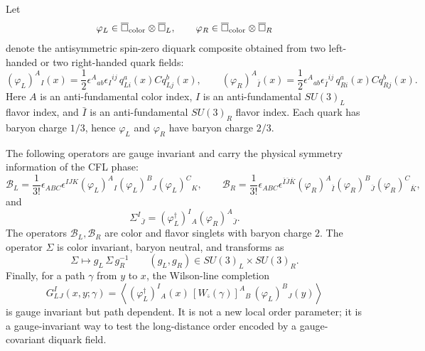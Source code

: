 \begin{definition}
\label{def:qcd-cfl-gauge-invariant-diagnostics}
Let
\[
  \varphi_L\in
  \overline{\square}_{\rm color}\otimes
  \overline{\square}_{L},
  \qquad
  \varphi_R\in
  \overline{\square}_{\rm color}\otimes
  \overline{\square}_{R}
\]
denote the antisymmetric spin-zero diquark composite obtained from two
left-handed or two right-handed quark fields:
\begin{equation}
  (\varphi_L)^A{}_{I}(x)
  =
  \frac12
  \epsilon^{A}{}_{ab}\epsilon_{I}{}^{ij}\,
  q^a_{L i}(x)Cq^b_{L j}(x),
  \qquad
  (\varphi_R)^A{}_{\bar I}(x)
  =
  \frac12
  \epsilon^{A}{}_{ab}\epsilon_{\bar I}{}^{ij}\,
  q^a_{R i}(x)Cq^b_{R j}(x).
  \label{eq:qcd-cfl-diquark-varphi}
\end{equation}
Here \(A\) is an anti-fundamental color index, \(I\) is an
anti-fundamental \(SU(3)_L\) flavor index, and \(\bar I\) is an
anti-fundamental \(SU(3)_R\) flavor index.  Each quark has baryon charge
\(1/3\), hence \(\varphi_L\) and \(\varphi_R\) have baryon charge \(2/3\).

The following operators are gauge invariant and carry the physical symmetry
information of the CFL phase:
\begin{equation}
  \mathcal B_L
  =
  \frac1{3!}
  \epsilon_{ABC}\epsilon^{IJK}
  (\varphi_L)^A{}_{I}(\varphi_L)^B{}_{J}(\varphi_L)^C{}_{K},
  \qquad
  \mathcal B_R
  =
  \frac1{3!}
  \epsilon_{ABC}\epsilon^{\bar I\bar J\bar K}
  (\varphi_R)^A{}_{\bar I}(\varphi_R)^B{}_{\bar J}
  (\varphi_R)^C{}_{\bar K},
  \label{eq:qcd-cfl-baryon-superfluid-composites}
\end{equation}
and
\begin{equation}
  \Sigma^{I}{}_{\bar J}
  =
  (\varphi_L^\dagger)^{I}{}_{A}
  (\varphi_R)^A{}_{\bar J}.
  \label{eq:qcd-cfl-chiral-composite}
\end{equation}
The operators \(\mathcal B_L,\mathcal B_R\) are color and flavor singlets
with baryon charge \(2\).  The operator \(\Sigma\) is color invariant,
baryon neutral, and transforms as
\[
  \Sigma\longmapsto g_L\,\Sigma\,g_R^{-1}
  \qquad
  (g_L,g_R)\in SU(3)_L\times SU(3)_R .
\]
Finally, for a path \(\gamma\) from \(y\) to \(x\), the Wilson-line
completion
\begin{equation}
  G_L^{I}{}_{J}(x,y;\gamma)
  =
  \left\langle
  (\varphi_L^\dagger)^{I}{}_{A}(x)\,
  \left[W_{\overline{\square}}(\gamma)\right]^{A}{}_{B}\,
  (\varphi_L)^B{}_{J}(y)
  \right\rangle
  \label{eq:qcd-cfl-wilson-line-diquark-correlator}
\end{equation}
is gauge invariant but path dependent.  It is not a new local order
parameter; it is a gauge-invariant way to test the long-distance order
encoded by a gauge-covariant diquark field.
\end{definition}

